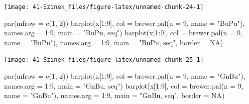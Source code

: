 \documentclass[
]{book}
\newenvironment{Shaded}{\begin{snugshade}}{\end{snugshade}}
\newcommand{\AttributeTok}[1]{\textcolor[rgb]{0.77,0.63,0.00}{#1}}
\newcommand{\ConstantTok}[1]{\textcolor[rgb]{0.00,0.00,0.00}{#1}}
\newcommand{\DecValTok}[1]{\textcolor[rgb]{0.00,0.00,0.81}{#1}}
\newcommand{\FunctionTok}[1]{\textcolor[rgb]{0.00,0.00,0.00}{#1}}
\newcommand{\NormalTok}[1]{#1}
\newcommand{\SpecialCharTok}[1]{\textcolor[rgb]{0.00,0.00,0.00}{#1}}
\newcommand{\StringTok}[1]{\textcolor[rgb]{0.31,0.60,0.02}{#1}}
\begin{document}
\begin{center}\texttt{[image: 41-Szinek\_files/figure-latex/unnamed-chunk-24-1]} \end{center}

\begin{Shaded}
\begin{Highlighting}[]
\FunctionTok{par}\NormalTok{(}\AttributeTok{mfrow =} \FunctionTok{c}\NormalTok{(}\DecValTok{1}\NormalTok{, }\DecValTok{2}\NormalTok{))}
\FunctionTok{barplot}\NormalTok{(x[}\DecValTok{1}\SpecialCharTok{:}\DecValTok{9}\NormalTok{], }\AttributeTok{col =} \FunctionTok{brewer.pal}\NormalTok{(}\AttributeTok{n =} \DecValTok{9}\NormalTok{, }\AttributeTok{name =} \StringTok{"BuPu"}\NormalTok{), }\AttributeTok{names.arg =} \DecValTok{1}\SpecialCharTok{:}\DecValTok{9}\NormalTok{, }\AttributeTok{main =} \StringTok{"BuPu, seq"}\NormalTok{)}
\FunctionTok{barplot}\NormalTok{(x[}\DecValTok{1}\SpecialCharTok{:}\DecValTok{9}\NormalTok{], }\AttributeTok{col =} \FunctionTok{brewer.pal}\NormalTok{(}\AttributeTok{n =} \DecValTok{9}\NormalTok{, }\AttributeTok{name =} \StringTok{"BuPu"}\NormalTok{), }\AttributeTok{names.arg =} \DecValTok{1}\SpecialCharTok{:}\DecValTok{9}\NormalTok{, }\AttributeTok{main =} \StringTok{"BuPu, seq"}\NormalTok{, }
    \AttributeTok{border =} \ConstantTok{NA}\NormalTok{)}
\end{Highlighting}
\end{Shaded}

\begin{center}\texttt{[image: 41-Szinek\_files/figure-latex/unnamed-chunk-25-1]} \end{center}

\begin{Shaded}
\begin{Highlighting}[]
\FunctionTok{par}\NormalTok{(}\AttributeTok{mfrow =} \FunctionTok{c}\NormalTok{(}\DecValTok{1}\NormalTok{, }\DecValTok{2}\NormalTok{))}
\FunctionTok{barplot}\NormalTok{(x[}\DecValTok{1}\SpecialCharTok{:}\DecValTok{9}\NormalTok{], }\AttributeTok{col =} \FunctionTok{brewer.pal}\NormalTok{(}\AttributeTok{n =} \DecValTok{9}\NormalTok{, }\AttributeTok{name =} \StringTok{"GnBu"}\NormalTok{), }\AttributeTok{names.arg =} \DecValTok{1}\SpecialCharTok{:}\DecValTok{9}\NormalTok{, }\AttributeTok{main =} \StringTok{"GnBu, seq"}\NormalTok{)}
\FunctionTok{barplot}\NormalTok{(x[}\DecValTok{1}\SpecialCharTok{:}\DecValTok{9}\NormalTok{], }\AttributeTok{col =} \FunctionTok{brewer.pal}\NormalTok{(}\AttributeTok{n =} \DecValTok{9}\NormalTok{, }\AttributeTok{name =} \StringTok{"GnBu"}\NormalTok{), }\AttributeTok{names.arg =} \DecValTok{1}\SpecialCharTok{:}\DecValTok{9}\NormalTok{, }\AttributeTok{main =} \StringTok{"GnBu, seq"}\NormalTok{, }
    \AttributeTok{border =} \ConstantTok{NA}\NormalTok{)}
\end{Highlighting}
\end{Shaded}
\end{document}
